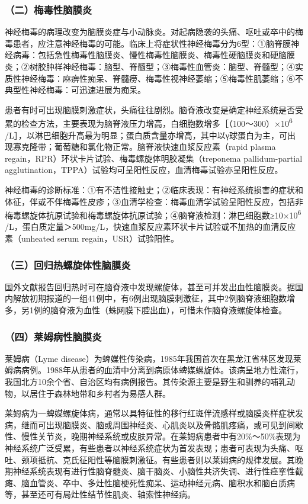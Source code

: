 \subsubsection{（二）梅毒性脑膜炎}

神经梅毒的病理改变为脑膜炎症与小动脉炎。对起病隐袭的头痛、呕吐或卒中的梅毒患者，应注意神经梅毒的可能。临床上将症状性神经梅毒分为6型：①脑脊膜神经病毒：包括急性梅毒性脑膜炎、慢性梅毒性脑膜炎、梅毒性硬脑膜炎和硬脑膜炎；②树胶肿样神经梅毒：脑型、脊髓型；③梅毒性血管炎：脑型、脊髓型；④实质性神经梅毒：麻痹性痴呆、脊髓痨、梅毒性视神经萎缩；⑤梅毒性肌萎缩；⑥不典型性神经梅毒：可迅速进展为痴呆。

患者有时可出现脑膜刺激症状，头痛往往剧烈。脑脊液改变是确定神经系统是否受累的检查方法，主要表现为脑脊液压力增高，白细胞数增多［（100～300）×10\textsuperscript{6}
/L］，以淋巴细胞升高最为明显；蛋白质含量亦增高，其中以γ球蛋白为主，可出现寡克隆带；葡萄糖和氯化物正常。脑脊液快速血浆反应素（rapid
plasma regain，RPR）环状卡片试验、梅毒螺旋体明胶凝集（treponema
pallidum-partial
agglutination，TPPA）试验均可呈阳性反应，血清梅毒试验亦呈阳性反应。

神经梅毒的诊断标准：①有不洁性接触史；②临床表现：有神经系统损害的症状和体征，伴或不伴梅毒性皮疹；③血清学检查：梅毒血清学试验呈阳性反应，包括非梅毒螺旋体抗原试验和梅毒螺旋体抗原试验；④脑脊液检测：淋巴细胞数≥10×10\textsuperscript{6}
/L，蛋白质定量＞500mg/L，快速血浆反应素环状卡片试验或不加热的血清反应素（unheated
serum regain，USR）试验阳性。

\subsubsection{（三）回归热螺旋体性脑膜炎}

国外文献报告回归热时可在脑脊液中发现螺旋体，甚至可并发出血性脑膜炎。据国内解放初期报道的一组41例中，有6例出现脑膜刺激征，其中2例脑脊液细胞数增多，另1例的脑脊液为血性（蛛网膜下腔出血），可惜未作脑脊液螺旋体检查。

\subsubsection{（四）莱姆病性脑膜炎}

莱姆病（Lyme
disease）为蜱媒性传染病，1985年我国首次在黑龙江省林区发现莱姆病病例。1988年从患者的血清中分离到病原体蜱媒螺旋体。该病呈地方性流行，我国北方10余个省、自治区均有病例报告。其传染源主要是野生和驯养的哺乳动物，以居住于森林地带和乡村者为易感人群。

莱姆病为一蜱媒螺旋体病，通常以具特征性的移行红斑伴流感样或脑膜炎样症状发病，继而可出现脑膜炎、脑或周围神经炎、心肌炎以及骨骼肌疼痛，或可见到间歇性、慢性关节炎，晚期神经系统或皮肤异常。在莱姆病患者中有20\%～50\%表现为神经系统广泛受累，有些患者以神经系统症状为首发表现；患者可表现为头痛、呕吐、颈项抵抗、克氏征阳性等脑膜刺激征。有些患者则以莱姆病的规律发展。其晚期神经系统表现有进行性脑脊髓炎、脑干脑炎、小脑性共济失调、进行性痉挛性截瘫、脑血管炎、卒中、多灶性脑梗死性痴呆、运动神经元病、脑积水和脑白质病等，甚至还可有局灶性结节性肌炎、轴索性神经病。

